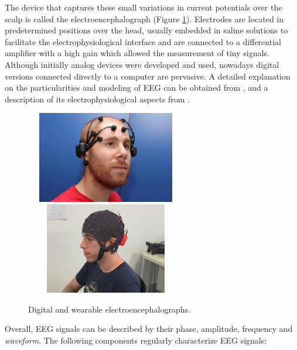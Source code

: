 
The device that captures these small variations in current potentials over the scalp is called the electroencephalograph (Figure \ref{fig:digitalelectroencephalograph}).  Electrodes are located in predetermined positions over the head, usually embedded in saline solutions to facilitate the electrophysiological interface and are connected to a differential amplifier with a high gain which allowed the measurement of tiny signals. Although initially analog devices were developed and used, nowadays digital versions connected directly to a computer are pervasive.  A detailed explanation on the particularities and modeling of EEG can be obtained from \cite{Jackson2014}, and a description of its electrophysiological aspects from \cite{Haberman2012}.

\begin{figure}[]
\centering
\includegraphics[height=4cm,width=7cm]{images/emotivsubject.jpg}
\includegraphics[height=4cm,width=7cm]{images/gTecsubject.jpg}
\caption[Wearable portable Digital Electroencephalograph]{Digital and wearable electroencephalographs.}
\label{fig:digitalelectroencephalograph}
\end{figure}


Overall, EEG signals can be described by their phase, amplitude,  frequency and \textit{waveform}.  The following components regularly  characterize EEG signals:


